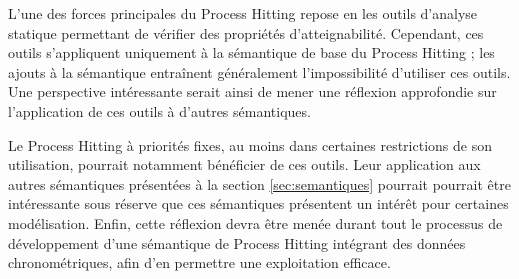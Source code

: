 L'une des forces principales du Process Hitting repose en les outils d'analyse statique permettant de vérifier des propriétés d'atteignabilité.
Cependant, ces outils s'appliquent uniquement à la sémantique de base du Process Hitting ;
les ajouts à la sémantique entraînent généralement l'impossibilité d'utiliser ces outils.
Une perspective intéressante serait ainsi de mener une réflexion approfondie sur l'application de ces outils à d'autres sémantiques.

Le Process Hitting à priorités fixes, au moins dans certaines restrictions de son utilisation, pourrait notamment bénéficier de ces outils.
Leur application aux autres sémantiques présentées à la section \ref{sec:semantiques} pourrait pourrait être intéressante sous réserve que ces sémantiques présentent un intérêt pour certaines modélisation.
Enfin, cette réflexion devra être menée durant tout le processus de développement d'une sémantique de Process Hitting intégrant des données chronométriques,
afin d'en permettre une exploitation efficace.



